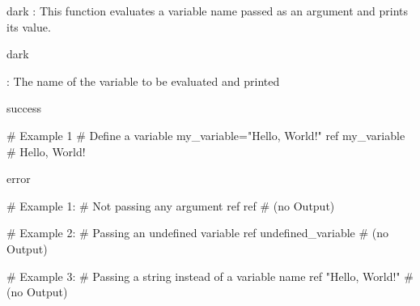 \label{ref}
\begin{baseBoxThree}{}{dark}
    \bigskip
    : This function evaluates a variable name passed as an argument and prints its value.
    \bigskip
    \begin{baseBoxThree}{\fO}{dark}
        \smallskip
        \begin{posnexItemize}
            \item[\sA] : The name of the variable to be evaluated and printed
        \end{posnexItemize}
        \smallskip
    \end{baseBoxThree}
    \smallskip
    \begin{baseBoxThree}{\fS}{success}
        \begin{posnex}
# Example 1
# Define a variable 
my_variable="Hello, World!"
ref my_variable
# Hello, World!
        \end{posnex}
    \end{baseBoxThree}
    \smallskip
    \begin{baseBoxThree}{\fX}{error}
        \begin{posnex}
# Example 1:
# Not passing any argument ref
ref # (no Output)

# Example 2:
# Passing an undefined variable
ref undefined_variable # (no Output)

# Example 3:
# Passing a string instead of a variable name
ref "Hello, World!" # (no Output)
        \end{posnex}
    \end{baseBoxThree}
    \smallskip
\end{baseBoxThree}
\bigskip

